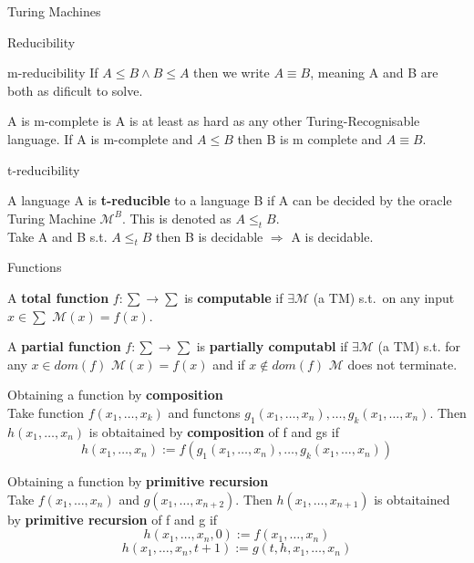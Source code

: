 \documentclass[12pt, letterpaper]{article}
\begin{document}
\begin{section}{Turing Machines}
\begin{subsection}{Reducibility}
\begin{subsubsection}{m-reducibility}
      If \(A \leq B \land B \leq A\) then we write \(A \equiv B\), meaning
      A and B are both as dificult to solve.

      A is m-complete is A is at least as hard as any other Turing-Recognisable language.
      If A is m-complete and \(A \leq B\) then B is m complete and \(A \equiv B\).

    \end{subsubsection}

    \begin{subsubsection}{t-reducibility}

      A language A is \textbf{t-reducible} to a language B if A can be decided
      by the oracle Turing Machine \(\mathscr{M}^{B}\). This is denoted as
      \(A \leq_{t} B\). \\
      Take A and B s.t. \(A \leq_{t} B\) then
      B is decidable \(\Rightarrow\) A is decidable.

    \end{subsubsection}

  \end{subsection}

  \begin{subsection}{Functions}

    A \textbf{total function} \(f: \sum \rightarrow \sum\) is \textbf{computable} if
    \(\exists \mathscr{M}\) (a TM) s.t.\ on any input \(x \in \sum\)
    \(\mathscr{M}(x) = f(x)\).

    A \textbf{partial function} \(f: \sum \rightarrow \sum\) is
    \textbf{partially computabl} if \(\exists \mathscr{M}\) (a TM) s.t.
    for any \(x \in dom(f)\) \(\mathscr{M}(x) = f(x)\) and if \(x \notin dom(f)\)
    \(\mathscr{M}\) does not terminate.

    Obtaining a function by \textbf{composition} \\
    Take function \(f(x_{1}, \dots, x_{k})\) and functons
    \(g_{1}(x_{1}, \dots, x_{n}), \dots, g_{k}(x_{1}, \dots, x_{n})\).
    Then \(h(x_{1}, \dots, x_{n})\) is obtaitained by \textbf{composition}
    of f and gs if
    \[h(x_{1}, \dots, x_{n}) := f(g_{1}(x_{1}, \dots, x_{n}), \dots, g_{k}(x_{1}, \dots, x_{n}))\]

    Obtaining a function by \textbf{primitive recursion} \\
    Take \(f(x_{1}, \dots, x_{n})\) and \(g(x_{1}, \dots, x_{n+2})\). Then
    \(h(x_{1}, \dots, x_{n + 1})\) is obtaitained by \textbf{primitive recursion}
    of f and g if
    \[h(x_{1}, \dots, x_{n}, 0) := f(x_{1}, \dots, x_{n})\]
    \[h(x_{1}, \dots, x_{n}, t + 1) := g(t, h, x_{1}, \dots, x_{n})\]


\end{subsection}
\end{section}
\end{document}
